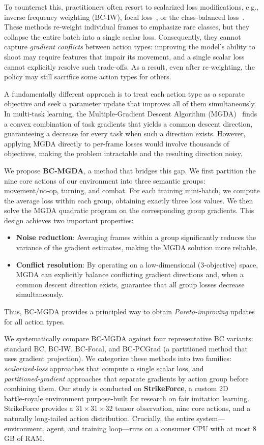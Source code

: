 \documentclass[conference]{IEEEtran}
\begin{document}
To counteract this, practitioners often resort to scalarized loss modifications, e.g., inverse frequency weighting (BC‑IW), focal loss~\cite{lin2017focal}, or the class‑balanced loss~\cite{cui2019class}. %
These methods re‑weight individual frames to emphasize rare classes, but they collapse the entire batch into a single scalar loss. Consequently, they cannot capture \emph{gradient conflicts} between action types: improving the model’s ability to shoot may require features that impair its movement, and a single scalar loss cannot explicitly resolve such trade‑offs. As a result, even after re‑weighting, the policy may still sacrifice some action types for others.

A fundamentally different approach is to treat each action type as a separate objective and seek a parameter update that improves all of them simultaneously. In multi‑task learning, the Multiple‑Gradient Descent Algorithm (MGDA)~\cite{desideri2012multiple,sener2018multi} finds a convex combination of task gradients that yields a common descent direction, guaranteeing a decrease for every task when such a direction exists. However, applying MGDA directly to per‑frame losses would involve thousands of objectives, making the problem intractable and the resulting direction noisy.

We propose \textbf{BC‑MGDA}, a method that bridges this gap. We first partition the nine core actions of our environment into three semantic groups: movement/no‑op, turning, and combat. For each training mini‑batch, we compute the average loss within each group, obtaining exactly three loss values. We then solve the MGDA quadratic program on the corresponding group gradients. This design achieves two important properties:
\begin{itemize}
    \item \textbf{Noise reduction}: Averaging frames within a group significantly reduces the variance of the gradient estimates, making the MGDA solution more reliable.
    \item \textbf{Conflict resolution}: By operating on a low‑dimensional (3‑objective) space, MGDA can explicitly balance conflicting gradient directions and, when a common descent direction exists, guarantee that all group losses decrease simultaneously.
\end{itemize}
Thus, BC‑MGDA provides a principled way to obtain \emph{Pareto‑improving} updates for all action types.

We systematically compare BC‑MGDA against four representative BC variants: standard BC, BC‑IW, BC‑Focal, and BC‑PCGrad (a partitioned method that uses gradient projection). We categorize these methods into two families: \emph{scalarized‑loss} approaches that compute a single scalar loss, and \emph{partitioned‑gradient} approaches that separate gradients by action group before combining them. Our study is conducted on \textbf{StrikeForce}, a custom 2D battle‑royale environment purpose‑built for research on fair imitation learning. StrikeForce provides a $31\times31\times32$ tensor observation, nine core actions, and a naturally long‑tailed action distribution. Crucially, the entire system—environment, agent, and training loop—runs on a consumer CPU with at most 8\,GB of RAM.
\end{document}
